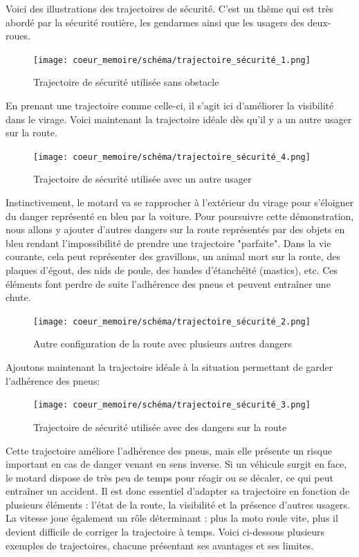 \vspace{0.5cm}
Voici des illustrations des trajectoires de sécurité. C'est un thème qui est très abordé par la sécurité routière, les gendarmes ainsi que les usagers des deux-roues. 
\begin{figure}[H]
    \centering
    \texttt{[image: coeur\_memoire/schéma/trajectoire\_sécurité\_1.png]} 
    \caption{Trajectoire de sécurité utilisée sans obstacle}
\end{figure}
En prenant une trajectoire comme celle-ci, il s'agit ici d'améliorer la visibilité dans le virage. Voici maintenant la trajectoire idéale dès qu'il y a un autre usager sur la route.
\begin{figure}[H]
    \centering
    \texttt{[image: coeur\_memoire/schéma/trajectoire\_sécurité\_4.png]} 
    \caption{Trajectoire de sécurité utilisée avec un autre usager}
\end{figure}
Instinctivement, le motard va se rapprocher à l'extérieur du virage pour s'éloigner du danger représenté en bleu par la voiture.
Pour poursuivre cette démonstration, nous allons y ajouter d'autres dangers sur la route représentés par des objets en bleu rendant l'impossibilité de prendre une trajectoire "parfaite". Dans la vie courante, cela peut représenter des gravillons, un animal mort sur la route, des plaques d'égout, des nids de poule, des bandes d'étanchéité (mastics), etc. Ces éléments font perdre de suite l'adhérence des pneus et peuvent entraîner une chute. 
\begin{figure}[H]
    \centering
    \texttt{[image: coeur\_memoire/schéma/trajectoire\_sécurité\_2.png]} 
    \caption{Autre configuration de la route avec plusieurs autres dangers}
\end{figure}
Ajoutons maintenant la trajectoire idéale à la situation permettant de garder l'adhérence des pneus:
\begin{figure}[H]
    \centering
    \texttt{[image: coeur\_memoire/schéma/trajectoire\_sécurité\_3.png]} 
    \caption{Trajectoire de sécurité utilisée avec des dangers sur la route}
    \label{fig:trajectoire_securite_difficulte}
\end{figure}
Cette trajectoire améliore l’adhérence des pneus, mais elle présente un risque important en cas de danger venant en sens inverse. Si un véhicule surgit en face, le motard dispose de très peu de temps pour réagir ou se décaler, ce qui peut entraîner un accident. Il est donc essentiel d’adapter sa trajectoire en fonction de plusieurs éléments : l’état de la route, la visibilité et la présence d’autres usagers. La vitesse joue également un rôle déterminant : plus la moto roule vite, plus il devient difficile de corriger la trajectoire à temps. Voici ci-dessous plusieurs exemples de trajectoires, chacune présentant ses avantages et ses limites.
